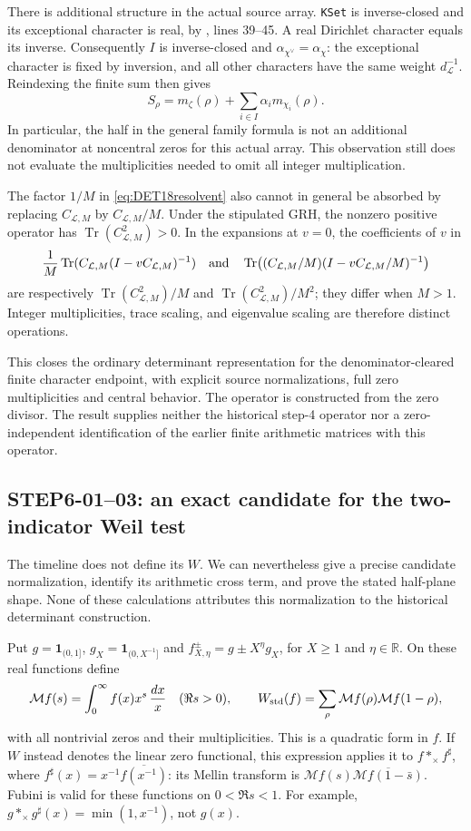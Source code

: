 \documentclass[11pt,a4paper]{article}
\newcommand{\Tr}{\operatorname{Tr}}
\newcommand{\M}{\mathcal M}
\newcommand{\R}{\mathbb R}
\begin{document}
There is additional structure in the actual source array.
\texttt{KSet} is inverse-closed and its exceptional character is
real, by , lines 39--45.
A real Dirichlet character equals its inverse. Consequently
$I$ is inverse-closed and $\alpha_{\chi^\vee}=\alpha_\chi$:
the exceptional character is fixed by inversion, and all other
characters have the same weight $d_{\mathcal L}^{-1}$.
Reindexing the finite sum then gives
\[
 S_\rho=m_\zeta(\rho)+\sum_{i\in I}\alpha_i m_{\chi_i}(\rho).
\]
In particular, the half in the general family formula is not an
additional denominator at noncentral zeros for this actual array.
This observation still does not evaluate the multiplicities needed
to omit all integer multiplication.

The factor $1/M$ in \eqref{eq:DET18resolvent} also cannot in general
be absorbed by replacing $C_{\mathcal L,M}$ by
$C_{\mathcal L,M}/M$. Under the stipulated GRH, the nonzero positive
operator has $\Tr(C_{\mathcal L,M}^2)>0$. In the expansions at $v=0$,
the coefficients of $v$ in
\[
 \frac1M\Tr(C_{\mathcal L,M}(I-vC_{\mathcal L,M})^{-1})
 \quad\hbox{and}\quad
 \Tr\bigl((C_{\mathcal L,M}/M)
 (I-vC_{\mathcal L,M}/M)^{-1}\bigr)
\]
are respectively $\Tr(C_{\mathcal L,M}^2)/M$ and
$\Tr(C_{\mathcal L,M}^2)/M^2$; they differ when $M>1$.
Integer multiplicities, trace scaling, and eigenvalue scaling are
therefore distinct operations.

This closes the ordinary determinant representation for the
denominator-cleared finite character endpoint, with explicit source
normalizations, full zero multiplicities and central behavior.
The operator is constructed from the zero divisor. The result
supplies neither the historical step-4 operator nor a zero-independent
identification of the earlier finite arithmetic matrices with this
operator.

\subsection{STEP6-01--03: an exact candidate for the two-indicator Weil test}
The timeline does not define its $W$. We can nevertheless give a precise candidate normalization, identify its arithmetic cross term, and prove the stated half-plane shape. None of these calculations attributes this normalization to the historical determinant construction.

Put $g=\mathbf1_{(0,1]}$, $g_X=\mathbf1_{(0,X^{-1}]}$ and $f^\pm_{X,\eta}=g\pm X^\eta g_X$, for $X\ge1$ and $\eta\in\R$. On these real functions define
\[
 \M f(s)=\int_0^\infty f(x)x^s\,\frac{dx}{x}\quad(\Re s>0),
 \qquad W_{\rm std}(f)=\sum_\rho\M f(\rho)\M f(1-\rho),
\]
with all nontrivial zeros and their multiplicities. This is a quadratic form in $f$. If $W$ instead denotes the linear zero functional, this expression applies it to $f*_\times f^\sharp$, where $f^\sharp(x)=x^{-1}\overline{f(x^{-1})}$: its Mellin transform is $\M f(s)\overline{\M f(1-\bar s)}$. Fubini is valid for these functions on $0<\Re s<1$. For example, $g*_\times g^\sharp(x)=\min(1,x^{-1})$, not $g(x)$.
\end{document}

